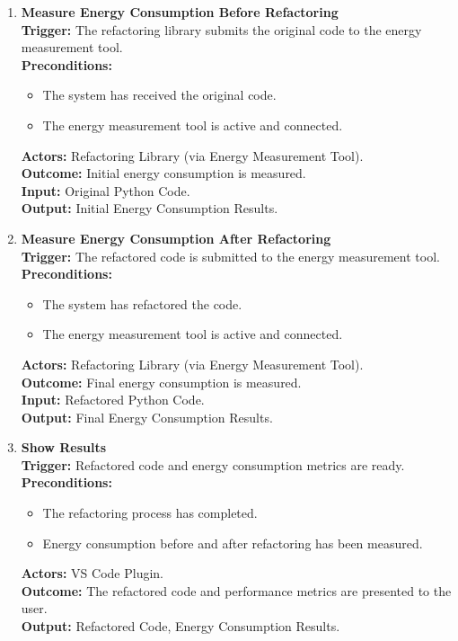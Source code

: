 \documentclass[12pt]{article}
\begin{document}
\begin{enumerate}[label={\bf PUC \arabic*:}, wide=0pt, font=\itshape]
  \item \textbf{Measure Energy Consumption Before Refactoring} \\[2mm]
    \textbf{Trigger:} The refactoring library submits the original code to the energy measurement tool. \\[2mm]
    \textbf{Preconditions:}
    \begin{itemize}
      \item The system has received the original code.
      \item The energy measurement tool is active and connected.
    \end{itemize}
    \textbf{Actors:} Refactoring Library (via Energy Measurement Tool). \\
    \textbf{Outcome:} Initial energy consumption is measured. \\
    \textbf{Input:} Original Python Code. \\
    \textbf{Output:} Initial Energy Consumption Results.

  \item \textbf{Measure Energy Consumption After Refactoring} \\[2mm]
    \textbf{Trigger:} The refactored code is submitted to the energy measurement tool. \\[2mm]
    \textbf{Preconditions:}
    \begin{itemize}
      \item The system has refactored the code.
      \item The energy measurement tool is active and connected.
    \end{itemize}
    \textbf{Actors:} Refactoring Library (via Energy Measurement Tool). \\
    \textbf{Outcome:} Final energy consumption is measured. \\
    \textbf{Input:} Refactored Python Code. \\
    \textbf{Output:} Final Energy Consumption Results.

  \item \textbf{Show Results} \\[2mm]
    \textbf{Trigger:} Refactored code and energy consumption metrics are ready. \\[2mm]
    \textbf{Preconditions:}
    \begin{itemize}
      \item The refactoring process has completed.
      \item Energy consumption before and after refactoring has been measured.
    \end{itemize}
    \textbf{Actors:} VS Code Plugin. \\
    \textbf{Outcome:} The refactored code and performance metrics are presented to the user. \\
    \textbf{Output:} Refactored Code, Energy Consumption Results.


\end{enumerate}
\end{document}
